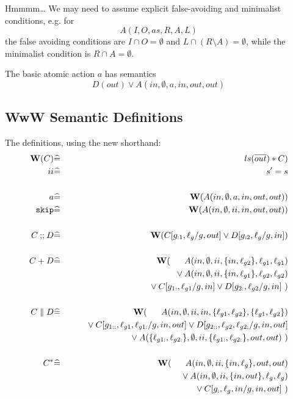 Hmmmm\dots
We may need to assume explicit false-avoiding and minimalist conditions,
e.g. for
\[
   A(I,O,as,R,A,L)
\]
the false avoiding conditions are
$I \cap O = \emptyset$
and $L \cap (R \setminus A) = \emptyset$,
while the minimalist condition is $R \cap A = \emptyset$.

The basic atomic action $a$ has semantics
\[
  D(out) \lor A(in,\emptyset,a,in,out,out)
\]

\subsection{WwW Semantic Definitions}
The definitions, using the new shorthand:
\begin{eqnarray*}
   \W(C) &\defs& ls(\B{out}) * C)
\\ ii &\defs& s'=s
\\
\\ a &\defs&\W(A(in,\emptyset,a,in,out,out))
\\ \cskip
   &\defs&
   \W(A(in,\emptyset,ii,in,out,out))
\\
\\ C \cseq D
   &\defs&
   \W(C[g_{:1},\ell_g/g,out] \lor D[g_{:2},\ell_g/g,in])
\\
\\ C + D
   &\defs&
   \W(\quad {}\phlor A(in,\emptyset,ii,\setof{in,\ell_{g2}},\ell_{g1},\ell_{g1})
\\ && \qquad {} \lor
   A(in,\emptyset,ii,\setof{in,\ell_{g1}},\ell_{g2},\ell_{g2})
\\ && \qquad {} \lor
   C[g_{1:},\ell_{g1}/g,in] \lor D[g_{2:},\ell_{g2}/g,in]~)
\\
\\ C \parallel D
   &\defs&
   \W(\quad\phlor A(in,\emptyset,ii,in,\setof{\ell_{g1},\ell_{g2}},\setof{\ell_{g1},\ell_{g2}})
\\ && \qquad {}\lor
   C[g_{1::},\ell_{g1},\ell_{g1:}/g,in,out]
   \lor D[g_{2::},\ell_{g2},\ell_{g2:}/g,in,out]
\\ && \qquad {}\lor
   A(\setof{\ell_{g1:},\ell_{g2:}},\emptyset
      ,ii
      ,\setof{\ell_{g1:},\ell_{g2:}},out,out)~)
\\
\\ C^*
   &\defs&
   \W(\quad\phlor A(in,\emptyset,ii,\setof{in,\ell_g},out,out)
\\ && \qquad {}\lor A(in,\emptyset,ii,\setof{in,out},\ell_g,\ell_g)
\\ && \qquad {}\lor C[g_{:},\ell_g,in/g,in,out]~)
\end{eqnarray*}































